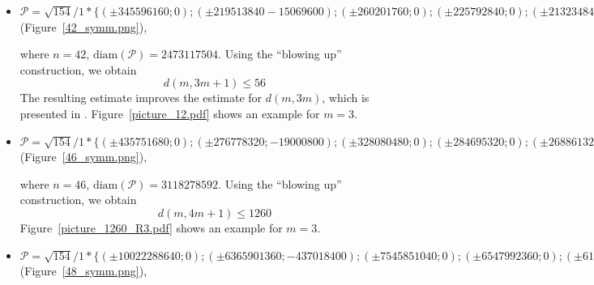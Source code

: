 \documentclass[12pt]{article}
\theoremstyle{theorem}
\theoremstyle{dfn}
\theoremstyle{remark}
\begin{document}
\begin{itemize}
\setlength{\itemsep}{-1mm}


\item
$\mathcal{P}=\sqrt{154}/{1} * \{ (\pm 345596160; 0);
(\pm219513840 -15069600);
(\pm260201760; 0);
(\pm225792840; 0);
(\pm213234840; 0);
(\pm153961080; 0);
(\pm144668160; 0
(\pm25116000; 0);
(\pm694026840; 0);
(\pm514710560; 0);
(\pm359116940; 0);
(\pm13423904; 0);
(\pm75682880; 0);
(\pm464143680; 0);
(\pm827069880; 0);
(\pm92144325; 0);
(\pm1195180740; 0);
(\pm1236558752; 0);
(\pm44590560; 0);
(\pm339925740; 0);
(\pm117312468; 0)\}
$
(Figure~\ref{42_symm.png}),

where $n = 42$, $\operatorname{diam(\mathcal{P})} = 2473117504$. Using the ``blowing up''
construction, we obtain
\begin{equation}\label{result2}
d(m, 3m + 1) \leq 56
\end{equation}
The resulting estimate improves the estimate for $d(m, 3m)$, which is presented
in \cite{kemnitz1988punktmengen}. Figure~\ref{picture_12.pdf} shows an example
for $m = 3$.


\item
$\mathcal{P}=\sqrt{154}/{1} * \{ (\pm435751680; 0);
(\pm276778320; -19000800);
(\pm328080480; 0);
(\pm284695320; 0);
(\pm268861320; 0);
(\pm194124840; 0);
(\pm182407680; 0);
(\pm31668000; 0);
(\pm1559139296; 0);
(\pm1506967020; 0);
(\pm1042827240; 0);
(\pm875077320; 0);
(\pm648982880; 0);
(\pm585224640; 0);
(\pm452799620; 0);
(\pm95426240; 0);
(\pm16925792; 0);
(\pm116181975; 0);
(\pm428602020; 0);
(\pm56222880; 0);
(\pm769560480; 0);
(\pm626458560; 0);
(\pm130761918; 0)\}
$
(Figure~\ref{46_symm.png}),

where $n = 46$, $\operatorname{diam(\mathcal{P})} = 3118278592$. Using the ``blowing up''
construction, we obtain
\begin{equation}\label{result3}
d(m, 4m + 1) \leq 1260
\end{equation}
Figure~\ref{picture_1260_R3.pdf} shows an example for $m = 3$.

\item
$\mathcal{P}=\sqrt{154}/{1} * \{ (\pm10022288640; 0);
( \pm6365901360 ; -437018400);
( \pm7545851040 ; 0);
( \pm6547992360 ; 0);
( \pm6183810360 ; 0);
( \pm4464871320 ; 0);
( \pm4195376640 ; 0);
( \pm728364000 ; 0);
( \pm35860203808 ; 0);
( \pm34660241460 ; 0);
( \pm23985026520 ; 0);
( \pm20126778360 ; 0);
( \pm14926606240 ; 0);
( \pm13460166720 ; 0);
( \pm10414391260 ; 0);
( \pm2194803520 ; 0);
( \pm389293216 ; 0);
( \pm2672185425 ; 0);
( \pm9857846460 ; 0);
( \pm1293126240 ; 0);
( \pm17699891040 ; 0);
( \pm14408546880 ; 0);
( \pm3007524114 ; 0);
( \pm3402061572 ; 0)\}
$
(Figure~\ref{48_symm.png}),

\end{itemize}
\end{document}
